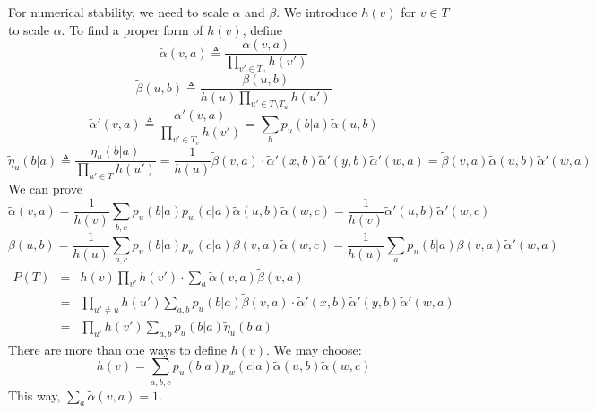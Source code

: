 \documentclass[10pt]{article}
\begin{document}
For numerical stability, we need to scale $\alpha$ and $\beta$.
We introduce $h(v)$ for $v\in T$ to scale $\alpha$.
To find a proper form of $h(v)$, define
$$ \tilde\alpha(v,a) \triangleq\frac{\alpha(v,a)}{\prod_{v'\in T_v}h(v')} $$
$$ \tilde\beta(u,b)  \triangleq\frac{\beta(u,b)}{h(u)\prod_{u'\in T\setminus T_u}h(u')} $$
$$ \tilde\alpha'(v,a)\triangleq\frac{\alpha'(v,a)}{\prod_{v'\in T_v}h(v')}=\sum_b p_u(b|a)\tilde\alpha(u,b) $$
$$ \tilde\eta_u(b|a) \triangleq\frac{\eta_u(b|a)}{\prod_{u'\in T}h(u')}
= \frac{1}{h(u)}\tilde\beta(v,a)\cdot\tilde\alpha'(x,b)\tilde\alpha'(y,b)\tilde\alpha'(w,a) = \tilde\beta(v,a)\tilde\alpha(u,b)\tilde\alpha'(w,a) $$
We can prove
$$ \tilde\alpha(v,a)=\frac{1}{h(v)}\sum_{b,c}p_u(b|a)p_w(c|a)\tilde\alpha(u,b)\tilde\alpha(w,c)=\frac{1}{h(v)}\tilde\alpha'(u,b)\tilde\alpha'(w,c) $$
$$ \tilde\beta(u,b)=\frac{1}{h(u)}\sum_{a,c}p_u(b|a)p_w(c|a)\tilde\beta(v,a)\tilde\alpha(w,c)=\frac{1}{h(u)}\sum_ap_u(b|a)\tilde\beta(v,a)\tilde\alpha'(w,a) $$
\begin{eqnarray*}
P(T)&=&h(v)\prod_{v'}h(v')\cdot\sum_a \tilde\alpha(v,a)\tilde\beta(v,a) \\
&=&\prod_{u'\not=u}h(u')\sum_{a,b}p_u(b|a)\tilde\beta(v,a)\cdot\tilde\alpha'(x,b)\tilde\alpha'(y,b)\tilde\alpha'(w,a) \\
&=&\prod_{u'}h(v')\sum_{a,b}p_u(b|a)\tilde\eta_u(b|a)
\end{eqnarray*}
There are more than one ways to define $h(v)$. We may choose:
$$ h(v)=\sum_{a,b,c}p_u(b|a)p_w(c|a)\tilde\alpha(u,b)\tilde\alpha(w,c) $$
This way, $\sum_a\tilde\alpha(v,a)=1$.
\end{document}
